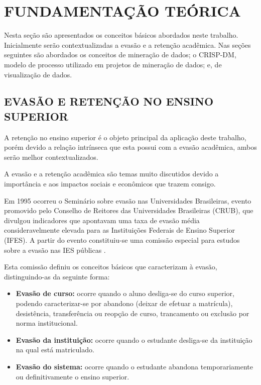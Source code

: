 
\chapter{FUNDAMENTAÇÃO TEÓRICA}
\label{chap:fundamentacaoTeorica}

Nesta seção são apresentados os conceitos básicos abordados neste trabalho. 
Inicialmente serão contextualizadas a evasão e a retenção acadêmica.
Nas seções seguintes são abordados os conceitos de mineração de dados; o CRISP-DM, modelo de processo utilizado em projetos de mineração de dados; e, de visualização de dados.

\section{EVASÃO E RETENÇÃO NO ENSINO SUPERIOR}

A retenção no ensino superior é o objeto principal da aplicação deste trabalho, porém devido a relação intrínseca que esta possui com a evasão acadêmica, ambos serão melhor contextualizados.

A evasão e a retenção acadêmica são temas muito discutidos devido a importância e aos impactos sociais e econômicos que trazem consigo.

Em 1995 ocorreu o Seminário sobre evasão nas Universidades Brasileiras, evento promovido pelo Conselho de Reitores das Universidades Brasileiras (CRUB), que divulgou indicadores que apontavam uma taxa de evasão média consideravelmente elevada para as Instituições Federais de Ensino Superior (IFES).
A partir do evento constituiu-se uma comissão especial para estudos sobre a evasão nas IES públicas \cite{Pereira2003, SESu1997, Silva2012}.

Esta comissão definiu os conceitos básicos que caracterizam à evasão, distinguindo-as da seguinte forma:

\begin{itemize}
    \item \textbf{Evasão de curso:} ocorre quando o aluno desliga-se do curso superior, podendo caracterizar-se por abandono (deixar de efetuar a matrícula), desistência, transferência ou reopção de curso, trancamento ou exclusão por norma institucional.
    \item \textbf{Evasão da instituição:} ocorre quando o estudante desliga-se da instituição na qual está matriculado.
    \item \textbf{Evasão do sistema:} ocorre quando o estudante abandona temporariamente ou definitivamente o ensino superior.
\end{itemize}

